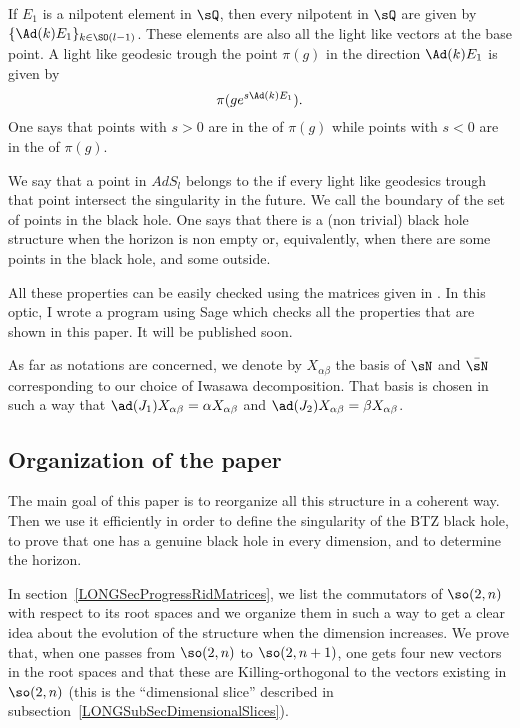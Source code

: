 If $E_1$ is a nilpotent element in $\sQ$, then every nilpotent in $\sQ$ are given by $\{ \Ad(k)E_1 \}_{k\in\SO(l-1)}$. These elements are also all the light like vectors at the base point. A light like geodesic trough the point $\pi(g)$ in the direction $\Ad(k)E_1$ is given by
\begin{equation}
	\pi(g e^{s\Ad(k)E_1}).
\end{equation}
One says that  points with $s>0$ are in the  of $\pi(g)$ while points with $s<0$ are in the  of $\pi(g)$.

We say that a point in $AdS_l$ belongs to the  if every light like geodesics trough that point intersect the singularity in the future. We call  the boundary of the set of points in the black hole. One says that there is a (non trivial) black hole structure when the horizon is non empty or, equivalently, when there are some points in the black hole, and some outside.

All these properties can be easily checked using the matrices given in \cite{These,lcTNAdS}. In this optic, I wrote a program using Sage\cite{sage} which checks all the properties that are shown in this paper. It will be published soon.

As far as notations are concerned, we denote by $X_{\alpha\beta}$ the basis of $\sN$ and $\bar\sN$ corresponding to our choice of Iwasawa decomposition. That basis is chosen in such a way that $\ad(J_1)X_{\alpha\beta}=\alpha X_{\alpha\beta}$ and $\ad(J_2)X_{\alpha\beta}=\beta X_{\alpha\beta}$.

%
\subsection{Organization of the paper}
%

The main goal of this paper is to reorganize all this structure in a coherent way. Then we use it efficiently in order to define the singularity of the BTZ black hole, to prove that one has a genuine black hole in every dimension, and to determine the horizon.

In section~\ref{LONGSecProgressRidMatrices}, we list the commutators of $\so(2,n)$ with respect to its root spaces and we organize them in such a way to get a clear idea about the evolution of the structure when the dimension increases. We prove that, when one passes from $\so(2,n)$ to $\so(2,n+1)$, one gets four new vectors in the root spaces and that these are Killing-orthogonal to the vectors existing in $\so(2,n)$ (this is the ``dimensional slice'' described in subsection~\ref{LONGSubSecDimensionalSlices}).

